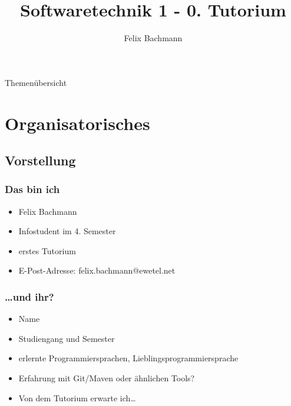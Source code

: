 \documentclass[18pt]{beamer}
\title[SWT1]{Softwaretechnik 1 - 0. Tutorium}
\author{Felix Bachmann}
\institute{KIT - Institut für Programmstrukturen und Datenorganisation (IPD)}
\begin{document}

\begin{frame}
\titlepage
\end{frame}

\begin{frame}{Themenübersicht}
\tableofcontents
\end{frame}

\section{Organisatorisches}
	\subsection{Vorstellung}
		\begin{frame}
			\frametitle{Das bin ich}
			\begin{itemize}
				\item Felix Bachmann
				\item Infostudent im 4. Semester
				\item erstes Tutorium
				\item E-Post-Adresse: felix.bachmann@ewetel.net
			\end{itemize}
		\end{frame}
		\begin{frame}
			\frametitle{\dots und ihr?}
			\begin{itemize}
				\item Name
				\item Studiengang und Semester
				\item erlernte Programmiersprachen, Lieblingsprogrammiersprache
				\item Erfahrung mit Git/Maven oder ähnlichen Tools?
				\item Von dem Tutorium erwarte ich\dots
			\end{itemize}
		\end{frame}
		
\end{document}
